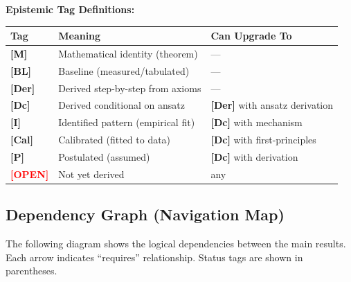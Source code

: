 \documentclass[11pt,a4paper]{article}
\newcommand{\tagP}{\textcolor{red!70!black}{\textbf{[P]}}}
\newcommand{\tagI}{\textcolor{orange!80!black}{\textbf{[I]}}}
\newcommand{\tagDc}{\textcolor{blue!70!black}{\textbf{[Dc]}}}
\newcommand{\tagDer}{\textcolor{green!50!black}{\textbf{[Der]}}}
\newcommand{\tagCal}{\textcolor{purple!70!black}{\textbf{[Cal]}}}
\newcommand{\tagBL}{\textcolor{gray!70!black}{\textbf{[BL]}}}
\newcommand{\tagOPEN}{\textcolor{red}{\textbf{[OPEN]}}}
\newcommand{\tagM}{\textcolor{black}{\textbf{[M]}}}
\begin{document}
\begin{statusbox}
\textbf{Epistemic Tag Definitions:}

\begin{tabular}{lll}
\toprule
\textbf{Tag} & \textbf{Meaning} & \textbf{Can Upgrade To} \\
\midrule
\tagM & Mathematical identity (theorem) & --- \\
\tagBL & Baseline (measured/tabulated) & --- \\
\tagDer & Derived step-by-step from axioms & --- \\
\tagDc & Derived conditional on ansatz & \tagDer{} with ansatz derivation \\
\tagI & Identified pattern (empirical fit) & \tagDc{} with mechanism \\
\tagCal & Calibrated (fitted to data) & \tagDc{} with first-principles \\
\tagP & Postulated (assumed) & \tagDc{} with derivation \\
\tagOPEN & Not yet derived & any \\
\bottomrule
\end{tabular}
\end{statusbox}

\subsection*{Dependency Graph (Navigation Map)}

The following diagram shows the logical dependencies between the main results. Each arrow indicates ``requires'' relationship. Status tags are shown in parentheses.
\end{document}
